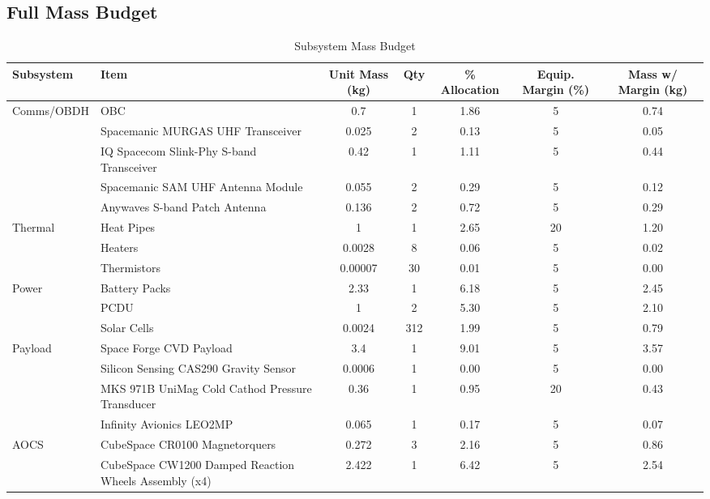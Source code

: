 \documentclass[a4paper, 11pt, conference]{IEEEtran}
\begin{document}
\clearpage

\subsection{Full Mass Budget}

\begin{table}[H]
\centering
\caption{Subsystem Mass Budget}
\begin{sideways}
\scriptsize
\begin{tabularx}{0.9\textheight}{l X c c c c c}
\toprule
\textbf{Subsystem} & \textbf{Item} & \textbf{Unit Mass (kg)} & \textbf{Qty} & \textbf{\% Allocation} & \textbf{Equip. Margin (\%)} & \textbf{Mass w/ Margin (kg)} \\
\midrule

Comms/OBDH  & OBC & 0.7 & 1 & 1.86 & 5 & 0.74 \\
            & Spacemanic MURGAS UHF Transceiver & 0.025 & 2 & 0.13 & 5 & 0.05 \\
            & IQ Spacecom Slink-Phy S-band Transceiver & 0.42 & 1 & 1.11 & 5 & 0.44 \\
            & Spacemanic SAM UHF Antenna Module & 0.055 & 2 & 0.29 & 5 & 0.12 \\
            & Anywaves S-band Patch Antenna & 0.136 & 2 & 0.72 & 5 & 0.29 \\
\midrule
Thermal     & Heat Pipes & 1 & 1 & 2.65 & 20 & 1.20 \\
            & Heaters & 0.0028 & 8 & 0.06 & 5 & 0.02 \\
            & Thermistors & 0.00007 & 30 & 0.01 & 5 & 0.00 \\
\midrule
Power       & Battery Packs & 2.33 & 1 & 6.18 & 5 & 2.45 \\
            & PCDU & 1 & 2 & 5.30 & 5 & 2.10 \\
            & Solar Cells & 0.0024 & 312 & 1.99 & 5 & 0.79 \\
\midrule
Payload     & Space Forge CVD Payload & 3.4 & 1 & 9.01 & 5 & 3.57 \\
            & Silicon Sensing CAS290 Gravity Sensor & 0.0006 & 1 & 0.00 & 5 & 0.00 \\
            & MKS 971B UniMag Cold Cathod Pressure Transducer & 0.36 & 1 & 0.95 & 20 & 0.43 \\
            & Infinity Avionics LEO2MP & 0.065 & 1 & 0.17 & 5 & 0.07 \\
\midrule
AOCS        & CubeSpace CR0100 Magnetorquers & 0.272 & 3 & 2.16 & 5 & 0.86 \\
            & CubeSpace CW1200 Damped Reaction Wheels Assembly (x4) & 2.422 & 1 & 6.42 & 5 & 2.54 \\

\end{tabularx}
\end{sideways}
\end{table}
\end{document}
